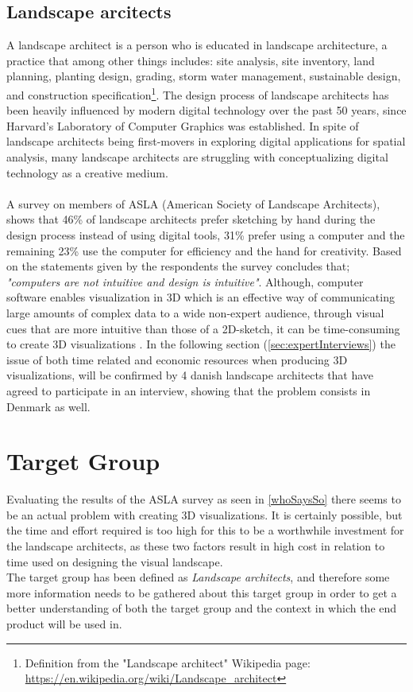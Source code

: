\subsection{Landscape arcitects}\label{whoSaysSo}
A landscape architect is a person who is educated in landscape architecture, a practice that among other things includes: site analysis, site inventory, land planning, planting design, grading, storm water management, sustainable design, and construction specification\footnote{Definition from the "Landscape architect" Wikipedia page: \url{https://en.wikipedia.org/wiki/Landscape\_architect}}.
The design process of landscape architects has been heavily influenced by modern digital technology over the past 50 years, since Harvard's Laboratory of Computer Graphics was established.\cite{landscapeArchitectureDigiTech} In spite of landscape architects being first-movers in exploring digital applications for spatial analysis, many landscape architects are struggling with conceptualizing digital technology as a creative medium\cite{landscapeArchitectureDigiTech}. \\
\\
A survey on members of ASLA (American Society of Landscape Architects)\cite{surveySketchVSDigital}, shows that 46\% of landscape architects prefer sketching by hand during the design process instead of using digital tools, 31\% prefer using a computer and the remaining 23\% use the computer for efficiency and the hand for creativity. Based on the statements given by the respondents the survey concludes that; \textit{"computers are not intuitive and design is intuitive"}\cite{landscapeArchitectureDigiTech}\cite{surveySketchVSDigital}. Although, computer software enables visualization in 3D which is an effective way of communicating large amounts of complex data to a wide non-expert audience, through visual cues that are more intuitive than those of a 2D-sketch, it can be time-consuming to create 3D visualizations\cite{landscapeVisual} . In the following section (\autoref{sec:expertInterviews}) the issue of both time related and economic resources when producing 3D visualizations, will be confirmed by 4 danish landscape architects that have agreed to participate in an interview, showing that the problem consists in Denmark as well.

\section{Target Group}\label{sec:targetGroup}
Evaluating the results of the ASLA survey as seen in \autoref{whoSaysSo} there seems to be an actual problem with creating 3D visualizations. It is certainly possible, but the time and effort required is too high for this to be a worthwhile investment for the landscape architects, as these two factors result in high cost in relation to time used on designing the visual landscape. \\
The target group has been defined as \textit{Landscape architects}, and therefore some more information needs to be gathered about this target group in order to get a better understanding of both the target group and the context in which the end product will be used in.


